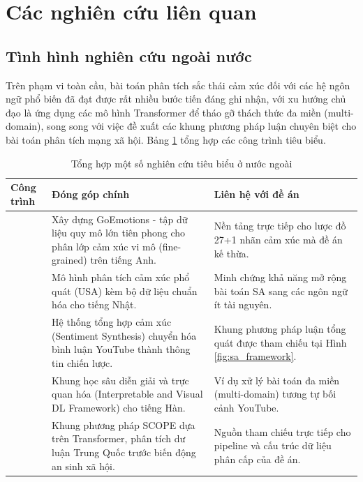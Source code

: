 \section{Các nghiên cứu liên quan}

\subsection{Tình hình nghiên cứu ngoài nước}
Trên phạm vi toàn cầu, bài toán phân tích sắc thái cảm xúc đối với các hệ ngôn ngữ phổ biến đã đạt được rất nhiều bước tiến đáng ghi nhận, với xu hướng chủ đạo là ứng dụng các mô hình Transformer để tháo gỡ thách thức đa miền (multi-domain), song song với việc đề xuất các khung phương pháp luận chuyên biệt cho bài toán phân tích mạng xã hội. Bảng \ref{tab:related_intl} tổng hợp các công trình tiêu biểu.

\begin{table}[H]
\centering
\caption{Tổng hợp một số nghiên cứu tiêu biểu ở nước ngoài}
\label{tab:related_intl}
\begin{tabular}{|p{3cm}|p{6.5cm}|p{4.5cm}|}
\hline
\textbf{Công trình} & \textbf{Đóng góp chính} & \textbf{Liên hệ với đề án} \\ \hline
\textcite{demszky2020goemotions} & Xây dựng GoEmotions - tập dữ liệu quy mô lớn tiên phong cho phân lớp cảm xúc vi mô (fine-grained) trên tiếng Anh. & Nền tảng trực tiếp cho lược đồ 27+1 nhãn cảm xúc mà đề án kế thừa. \\ \hline
\textcite{gan2023usa} & Mô hình phân tích cảm xúc phổ quát (USA) kèm bộ dữ liệu chuẩn hóa cho tiếng Nhật. & Minh chứng khả năng mở rộng bài toán SA sang các ngôn ngữ ít tài nguyên. \\ \hline
\textcite{Maheswari2024Sentiment} & Hệ thống tổng hợp cảm xúc (Sentiment Synthesis) chuyển hóa bình luận YouTube thành thông tin chiến lược. & Khung phương pháp luận tổng quát được tham chiếu tại Hình \ref{fig:sa_framework}. \\ \hline
\textcite{zhao2025interpretable} & Khung học sâu diễn giải và trực quan hóa (Interpretable and Visual DL Framework) cho tiếng Hàn. & Ví dụ xử lý bài toán đa miền (multi-domain) tương tự bối cảnh YouTube. \\ \hline
\textcite{ding2026scope} & Khung phương pháp SCOPE dựa trên Transformer, phân tích dư luận Trung Quốc trước biến động an sinh xã hội. & Nguồn tham chiếu trực tiếp cho pipeline và cấu trúc dữ liệu phân cấp của đề án. \\ \hline
\end{tabular}
\end{table}

